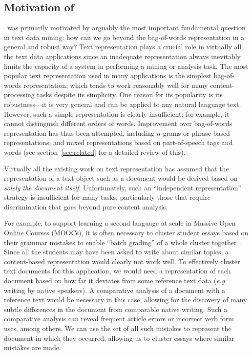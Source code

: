 \subsection{Motivation of \sd}

\sd~was primarily motivated by arguably the most important fundamental question
in text data mining: how can we go beyond the bag-of-words representation in a
general and robust way? Text representation plays a crucial role in virtually
all the text data applications since an inadequate representation always
inevitably limits the capacity of a system in performing a mining or analysis
task. The most popular text representation used in many applications is the
simplest bag-of-words representation, which tends to work reasonably well for
many content-processing tasks despite its simplicity. One reason for its
popularity is its robustness---it is very general and can be applied to any
natural language text. However, such a simple representation is clearly
insufficient; for example, it cannot distinguish different orders of words.
Improvement over bag-of-words representation has thus been attempted, including
$n$-grams or phrase-based representations, and mixed representations based on
part-of-speech tags and words (see section~\ref{sec:related} for a detailed
review of this).

Virtually all the existing work on text representation has assumed that the
representation of a text object such as a document would be derived based on
{\em solely the document itself}. Unfortunately, such an ``independent
representation'' strategy is insufficient for many tasks, particularly those
that require discrimination that goes beyond pure content analysis.

For example, to support learning a second language at scale in Massive Open
Online Courses (MOOCs), it is often necessary to cluster student essays based on
their grammar mistakes to enable ``batch grading'' of a whole cluster
together~\cite{scaling-mooc}. Since all the students may have been asked to
write about similar topics, a content-based representation would clearly not
work well. To effectively cluster text documents for this application, we would
need a representation of each document based on how far it deviates from some
reference text data (\emph{e.g.} writing by native speakers). A comparative
analysis of a document with a reference text would be necessary in this case,
allowing for the discovery of many subtle differences in the document from
comparable native writing. Such a comparative analysis can reveal frequent
article errors or incorrect verb form uses, among others. We can use the set of
all such mistakes to represent the document in which they occurred, allowing us
to cluster essays where similar mistakes are made.

